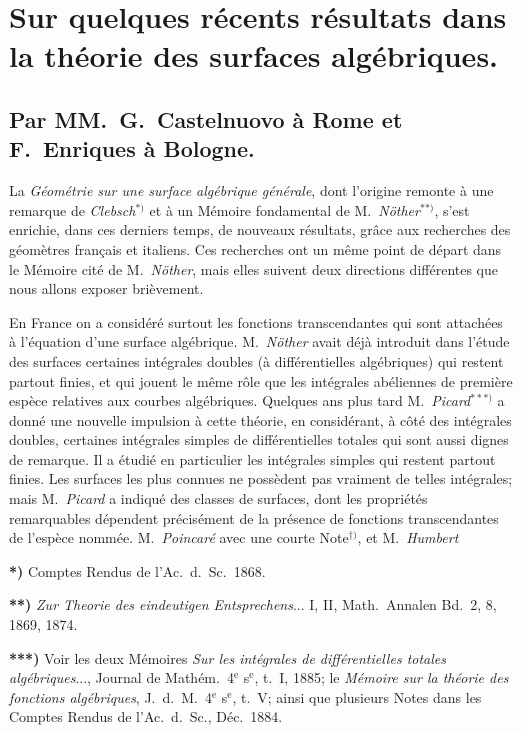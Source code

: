 \documentclass{article}
\begin{document}

\section*{Sur quelques récents résultats dans la théorie des surfaces algébriques.}

\subsection*{Par MM.\ G.\ Castelnuovo à Rome et F.\ Enriques à Bologne.}

La \emph{Géométrie sur une surface algébrique générale}, dont l'origine remonte à une remarque de \emph{Clebsch}${}^{*)}$ et à un Mémoire fondamental de M.\ \emph{Nöther}${}^{**)}$, s'est enrichie, dans ces derniers temps, de nouveaux résultats, grâce aux recherches des géomètres français et italiens. Ces recherches ont un même point de départ dans le Mémoire cité de M.\ \emph{Nöther}, mais elles suivent deux directions différentes que nous allons exposer brièvement.

En France on a considéré surtout les fonctions transcendantes qui sont attachées à l'équation d'une surface algébrique. M.\ \emph{Nöther} avait déjà introduit dans l'étude des surfaces certaines intégrales doubles (à différentielles algébriques) qui restent partout finies, et qui jouent le même rôle que les intégrales abéliennes de première espèce relatives aux courbes algébriques. Quelques ans plus tard M.\ \emph{Picard}${}^{***)}$ a donné une nouvelle impulsion à cette théorie, en considérant, à côté des intégrales doubles, certaines intégrales simples de différentielles totales qui sont aussi dignes de remarque. Il a étudié en particulier les intégrales simples qui restent partout finies. Les surfaces les plus connues ne possèdent pas vraiment de telles intégrales; mais M.\ \emph{Picard} a indiqué des classes de surfaces, dont les propriétés remarquables dépendent précisément de la présence de fonctions transcendantes de l'espèce nommée. M.\ \emph{Poincaré} avec une courte Note${}^{\dagger)}$, et M.\ \emph{Humbert}

\textbf{*)} Comptes Rendus de l'Ac.\ d.\ Sc.\ 1868.

\textbf{**)} \emph{Zur Theorie des eindeutigen Entsprechens}... I, II, Math.\ Annalen Bd.\ 2, 8, 1869, 1874.

\textbf{***)} Voir les deux Mémoires \emph{Sur les intégrales de différentielles totales algébriques}..., Journal de Mathém.\ 4${}^{\text{e}}$ s${}^{\text{e}}$, t.\ I, 1885; le \emph{Mémoire sur la théorie des fonctions algébriques}, J.\ d.\ M.\ 4${}^{\text{e}}$ s${}^{\text{e}}$, t.\ V; ainsi que plusieurs Notes dans les Comptes Rendus de l'Ac.\ d.\ Sc., Déc.\ 1884.
\end{document}
